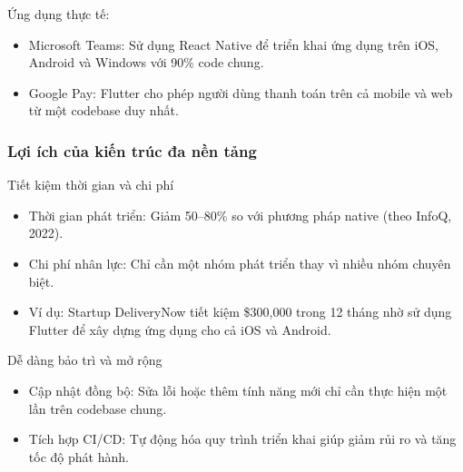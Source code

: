 \begin{flushleft}
    \begin{flushleft}
      \hspace*{0.8cm}Ứng dụng thực tế:
      \setlength{\leftmargini}{1.5cm}
      \begin{itemize}
          \item Microsoft Teams: Sử dụng React Native để triển khai ứng dụng trên iOS, Android và Windows với 90\% code chung.
          \item Google Pay: Flutter cho phép người dùng thanh toán trên cả mobile và web từ một codebase duy nhất.
      \end{itemize}
    \end{flushleft}

  \subsubsection{Lợi ích của kiến trúc đa nền tảng}
    \begin{flushleft}
      \hspace*{0.8cm}Tiết kiệm thời gian và chi phí
      \setlength{\leftmargini}{1.5cm}
      \begin{itemize}
        \item Thời gian phát triển: Giảm 50–80\% so với phương pháp native (theo InfoQ, 2022).
        \item Chi phí nhân lực: Chỉ cần một nhóm phát triển thay vì nhiều nhóm chuyên biệt.
        \item Ví dụ: Startup DeliveryNow tiết kiệm \$300,000 trong 12 tháng nhờ sử dụng Flutter để xây dựng ứng dụng cho cả iOS và Android.
      \end{itemize}
    \end{flushleft}

    \begin{flushleft}
      \hspace*{0.8cm}Dễ dàng bảo trì và mở rộng
      \setlength{\leftmargini}{1.5cm}
      \begin{itemize}
          \item Cập nhật đồng bộ: Sửa lỗi hoặc thêm tính năng mới chỉ cần thực hiện một lần trên codebase chung.
          \item Tích hợp CI/CD: Tự động hóa quy trình triển khai giúp giảm rủi ro và tăng tốc độ phát hành.
      \end{itemize}
    \end{flushleft}


\end{flushleft}
